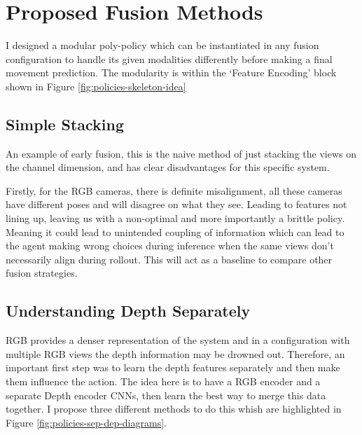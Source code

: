 
\section{Proposed Fusion Methods}\label{sec:proposed-fusion}
I designed a modular poly-policy which can be instantiated in any fusion configuration to handle its given modalities differently before making a final movement prediction. The modularity is within the `Feature Encoding' block shown in Figure \ref{fig:policies-skeleton-idea}


\subsection{Simple Stacking}
An example of early fusion, this is the naive method of just stacking the views on the channel dimension, and has clear disadvantages for this specific system.

Firstly, for the RGB cameras, there is definite misalignment, all these cameras have different poses and will disagree on what they see. Leading to features not lining up, leaving us with a non-optimal and more importantly a brittle policy. Meaning it could lead to unintended coupling of information which can lead to the agent making wrong choices during inference when the same views don't necessarily align during rollout. This will act as a baseline to compare other fusion strategies.

\subsection{Understanding Depth Separately}\label{subsec:policies-understand-depth-sep}
RGB provides a denser representation of the system and in a configuration with multiple RGB views the depth information may be drowned out. Therefore, an important first step was to learn the depth features separately and then make them influence the action. The idea here is to have a RGB encoder and a separate Depth encoder CNNs, then learn the best way to merge this data together. I propose three different methods to do this whish are highlighted in Figure \ref{fig:policies-sep-dep-diagrams}.

